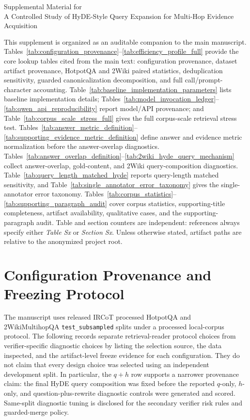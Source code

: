 \documentclass[10pt]{article}
\begin{document}
\begin{center}
{\Large Supplemental Material for}\\[3pt]
{\large A Controlled Study of HyDE-Style Query Expansion for Multi-Hop Evidence Acquisition}
\end{center}

\noindent
This supplement is organized as an auditable companion to the main manuscript. Tables~\ref{tab:configuration_provenance}--\ref{tab:efficiency_profile_full} provide the core lookup tables cited from the main text: configuration provenance, dataset artifact provenance, HotpotQA and 2Wiki paired statistics, deduplication sensitivity, guarded canonicalization decomposition, and full call/prompt-character accounting. Table~\ref{tab:baseline_implementation_parameters} lists baseline implementation details; Tables~\ref{tab:model_invocation_ledger}--\ref{tab:qwen_api_reproducibility} report model/API provenance; and Table~\ref{tab:corpus_scale_stress_full} gives the full corpus-scale retrieval stress test. Tables~\ref{tab:answer_metric_definition}--\ref{tab:supporting_evidence_metric_definition} define answer and evidence metric normalization before the answer-overlap diagnostics. Tables~\ref{tab:answer_overlap_definition}--\ref{tab:2wiki_hyde_query_mechanism} collect answer-overlap, gold-content, and 2Wiki query-composition diagnostics. Table~\ref{tab:query_length_matched_hyde} reports query-length matched sensitivity, and Table~\ref{tab:single_annotator_error_taxonomy} gives the single-annotator error taxonomy. Tables~\ref{tab:corpus_statistics}--\ref{tab:supporting_paragraph_audit} cover corpus statistics, supporting-title completeness, artifact availability, qualitative cases, and the supporting-paragraph audit. Table and section counters are independent: references always specify either \emph{Table Sx} or \emph{Section Sx}. Unless otherwise stated, artifact paths are relative to the anonymized project root.

\tableofcontents
\clearpage

\section{Configuration Provenance and Freezing Protocol}
\label{sec:supp_configuration_provenance}

The manuscript uses released IRCoT processed HotpotQA and 2WikiMultihopQA \texttt{test\_subsampled} splits under a processed local-corpus protocol. The following records separate retrieval-reader protocol choices from verifier-specific diagnostic choices by listing the selection source, the data inspected, and the artifact-level freeze evidence for each configuration. They do not claim that every design choice was selected using an independent development split. In particular, the $q+h$ row supports a narrower provenance claim: the final HyDE query composition was fixed before the reported $q$-only, $h$-only, and question-plus-rewrite diagnostic controls were generated and scored. Same-split diagnostic tuning is disclosed for the secondary verifier risk rules and guarded-merge policy.
\end{document}
